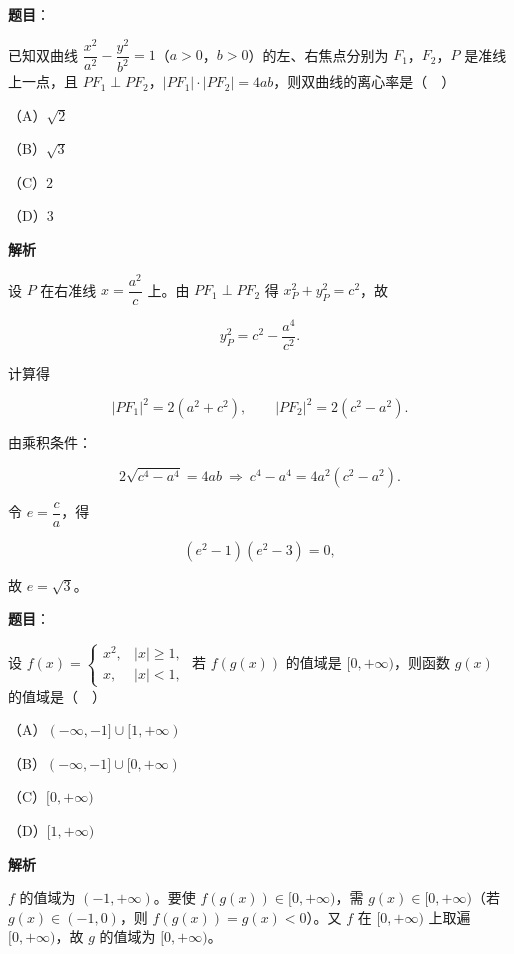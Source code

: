 \begin{answer}

\textbf{题目}：

已知双曲线 $\dfrac{x^2}{a^2}-\dfrac{y^2}{b^2}=1$（$a>0$，$b>0$）的左、右焦点分别为 $F_1$，$F_2$，$P$ 是准线上一点，且 $PF_1\perp PF_2$，$|PF_1|\cdot|PF_2|=4ab$，则双曲线的离心率是（　）

（A）$\sqrt2$

（B）$\sqrt3$

（C）$2$

（D）$3$

\textbf{解析}

设 $P$ 在右准线 $x=\dfrac{a^2}{c}$ 上。由 $PF_1\perp PF_2$ 得 $x_P^2+y_P^2=c^2$，故

\nopagebreak[4]
\[y_P^2=c^2-\frac{a^4}{c^2}.\]

计算得

\nopagebreak[4]
\[|PF_1|^2=2(a^2+c^2),\qquad |PF_2|^2=2(c^2-a^2).\]

由乘积条件：

\nopagebreak[4]
\[2\sqrt{c^4-a^4}=4ab\ \Rightarrow\ c^4-a^4=4a^2(c^2-a^2).\]

令 $e=\dfrac ca$，得

\nopagebreak[4]
\[(e^2-1)(e^2-3)=0,\]

故 $e=\sqrt3$。


\end{answer}
\begin{answer}

\textbf{题目}：

设 $f(x)=\begin{cases}x^2,&|x|\geqslant1,\\ x,&|x|<1,\end{cases}$ 若 $f(g(x))$ 的值域是 $[0,+\infty)$，则函数 $g(x)$ 的值域是（　）

（A）$(-\infty,-1]\cup[1,+\infty)$

（B）$(-\infty,-1]\cup[0,+\infty)$

（C）$[0,+\infty)$

（D）$[1,+\infty)$

\textbf{解析}

$f$ 的值域为 $(-1,+\infty)$。要使 $f(g(x))\in[0,+\infty)$，需 $g(x)\in[0,+\infty)$（若 $g(x)\in(-1,0)$，则 $f(g(x))=g(x)<0$）。又 $f$ 在 $[0,+\infty)$ 上取遍 $[0,+\infty)$，故 $g$ 的值域为 $[0,+\infty)$。


\end{answer}
